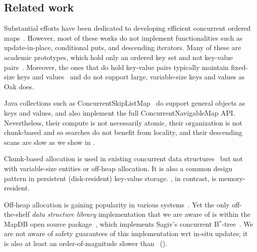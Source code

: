 \subsection{Related work}


Substantial efforts have been dedicated to developing efficient concurrent ordered maps~\cite{JavaSkipList,rcu,kiwi,Braginsky-BTree,related_1,related_2,related_3,related_4,related_5,related_6,related_7,related_8,related_9,related_10,the-art-of,transactional-lib,chunks,related_11}. 
However, most of these works do not implement functionalities such as update-in-place, conditional puts, and descending iterators. 
Many of these are academic prototypes, which hold only an ordered key set and not key-value pairs~\cite{related_2,related_3,related_4,related_5,related_8,related_11}. 
Moreover, the ones that do hold key-value pairs typically maintain fixed-size keys and values~\cite{kiwi,Braginsky-BTree,chunks} and do not support large, variable-size keys and values as Oak does. 

Java collections such as ConcurrentSkipListMap~\cite{JavaSkipList} do support general objects as keys and values, and also implement the full ConcurrentNavigableMap API.
Nevertheless, their compute is not necessarily atomic, their organization is not chunk-based and so searches do not benefit from locality, and their descending scans are slow
 as we show in .  

Chunk-based allocation is used in existing concurrent data structures~\cite{Braginsky-BTree,kiwi,chunks} but not with variable-size entities or off-heap allocation.
It is also a common design pattern in  persistent (disk-resident) key-value storage.  
\oak, in contrast, is memory-resident. %

Off-heap allocation is gaining popularity in various systems~\cite{off-heap-cassandra,off-heap-alibaba,accordion,HBase-off-heap,Druid-off-heap}.
Yet {the only off-the-shelf \emph{data structure library} implementation that we are aware of is within the MapDB 
open source package~\cite{MapDB}, which implements Sagiv's concurrent B$^*$-tree~\cite{Sagiv:1985}. We are 
not aware of safety guarantees of this implementation wrt in-situ updates; it is also at least an order-of-magnitude slower than \oak~().}


